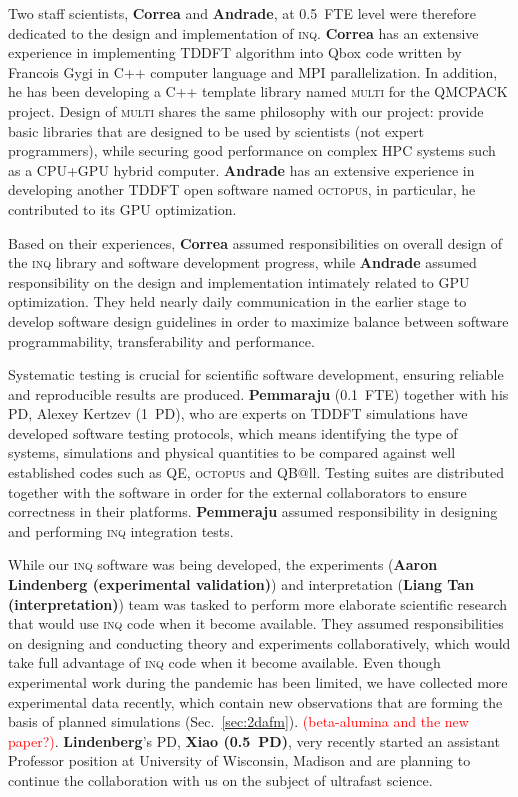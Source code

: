 Two staff scientists, {\bf Correa} and {\bf Andrade}, at 0.5~FTE level were therefore dedicated to the design and implementation of \textsc{inq}. 
{\bf Correa} has an extensive experience in implementing TDDFT algorithm into Qbox code written by Francois Gygi in C++ computer language and MPI parallelization. 
In addition, he has been developing a C++ template library named \textsc{multi} for the QMCPACK project.
Design of \textsc{multi} shares the same philosophy with our project: provide basic libraries that are designed to be used by scientists (not expert programmers), while securing good performance on complex HPC systems such as a CPU+GPU hybrid computer. 
{\bf Andrade} has an extensive experience in developing another TDDFT open software named \textsc{octopus}, in particular, he contributed to its GPU optimization.  

Based on their experiences, {\bf Correa} assumed responsibilities on overall design of the \textsc{inq} library and software development progress, while {\bf Andrade} assumed responsibility on the design and implementation intimately related to GPU optimization. 
They held nearly daily communication in the earlier stage to develop software design guidelines in order to maximize balance between software programmability, transferability and performance. 

Systematic testing is crucial for scientific software development, 
ensuring reliable and reproducible results are produced. 
{\bf Pemmaraju} (0.1~FTE) together with his PD, Alexey Kertzev (1~PD), who are experts on TDDFT simulations have developed software testing protocols, which means identifying the type of systems, simulations and physical quantities to be compared against well established codes such as QE, 
\textsc{octopus} and QB@ll. 
Testing suites are distributed together with the software in order for the external collaborators to ensure correctness in their platforms.
{\bf Pemmeraju} assumed responsibility in designing and performing \textsc{inq} integration tests.

While our \textsc{inq} software was being developed, the experiments ({\bf Aaron Lindenberg (experimental validation)}) and interpretation ({\bf Liang Tan (interpretation)}) team was tasked to perform more elaborate scientific research that would use \textsc{inq} code when it become available. 
They assumed responsibilities on designing and conducting theory and experiments collaboratively, which would take full advantage of \textsc{inq} code when it become available. Even though experimental work during the pandemic has been limited, we have collected more experimental data recently, which contain new observations that are forming the basis of planned simulations (Sec.~\ref{sec:2dafm}). \textcolor{red}{(beta-alumina and the new paper?)}. 
{\bf Lindenberg}'s PD, {\bf Xiao (0.5~PD)}, very recently started an assistant Professor position at University of Wisconsin, Madison and are planning to continue the collaboration with us on the subject of ultrafast science.

